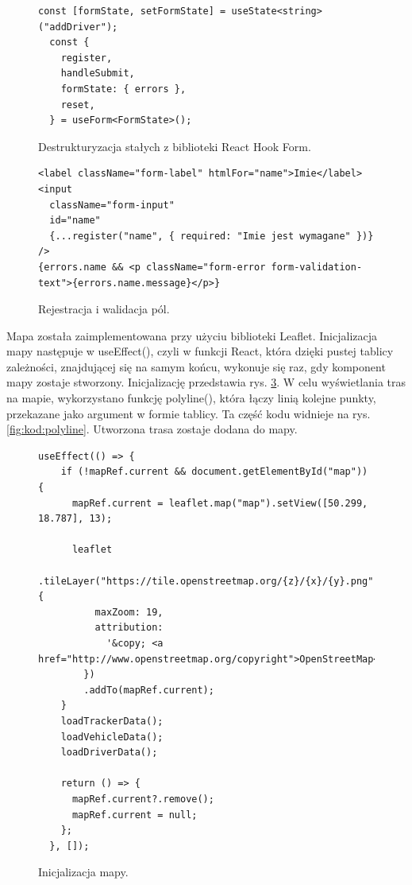 \begin{figure}
\centering
\begin{lstlisting}
const [formState, setFormState] = useState<string>("addDriver");
  const {
    register,
    handleSubmit,
    formState: { errors },
    reset,
  } = useForm<FormState>();
\end{lstlisting}
\caption{Destrukturyzacja stałych z biblioteki React Hook Form.}
\label{fig:kod:consts}
\end{figure}

\begin{figure}
\centering
\begin{lstlisting}
<label className="form-label" htmlFor="name">Imie</label>
<input
  className="form-input"
  id="name"
  {...register("name", { required: "Imie jest wymagane" })}
/>
{errors.name && <p className="form-error form-validation-text">{errors.name.message}</p>}
\end{lstlisting}
\caption{Rejestracja i walidacja pól.}
\label{fig:kod:register}
\end{figure}

Mapa została zaimplementowana przy użyciu biblioteki Leaflet. Inicjalizacja mapy następuje w useEffect(), czyli w funkcji React, która dzięki pustej tablicy zależności, znajdującej się na samym końcu, wykonuje się raz, gdy komponent mapy zostaje stworzony. Inicjalizację przedstawia rys. \ref{fig:kod:mapInit}. W celu wyświetlania tras na mapie, wykorzystano funkcję polyline(), która łączy linią kolejne punkty, przekazane jako argument w formie tablicy. Ta część kodu widnieje na rys. \ref{fig:kod:polyline}. Utworzona trasa zostaje dodana do mapy. 

\begin{figure}
\centering
\begin{lstlisting}
useEffect(() => {
    if (!mapRef.current && document.getElementById("map")) {
      mapRef.current = leaflet.map("map").setView([50.299, 18.787], 13);

      leaflet
        .tileLayer("https://tile.openstreetmap.org/{z}/{x}/{y}.png", {
          maxZoom: 19,
          attribution:
            '&copy; <a href="http://www.openstreetmap.org/copyright">OpenStreetMap</a>',
        })
        .addTo(mapRef.current);
    }
    loadTrackerData();
    loadVehicleData();
    loadDriverData();

    return () => {
      mapRef.current?.remove();
      mapRef.current = null;
    };
  }, []);
\end{lstlisting}
\caption{Inicjalizacja mapy.}
\label{fig:kod:mapInit}
\end{figure}

